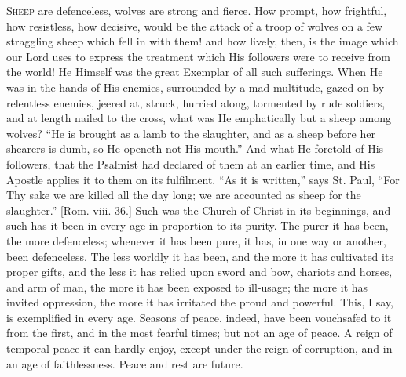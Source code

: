 S\textsc{heep} are defenceless, wolves are strong and fierce. How prompt,
how frightful, how resistless, how decisive, would be the attack of a
troop of wolves on a few straggling sheep which fell in with them! and
how lively, then, is the image which our Lord uses to express the
treatment which His followers were to receive from the world! He
Himself was the great Exemplar of all such sufferings. When He was in
the hands of His enemies, surrounded by a mad multitude, gazed on by
relentless enemies, jeered at, struck, hurried along, tormented by
rude soldiers, and at length nailed to the cross, what was He
emphatically but a sheep among wolves? ``He is brought as a lamb
to the slaughter, and as a sheep before her shearers is dumb, so He
openeth not His mouth.'' And what He foretold of His followers,
that the Psalmist had declared of them at an earlier time, and His
Apostle applies it to them on its fulfilment. ``As it is
written,'' says St. Paul, ``For Thy sake we are killed all the
day long; we are accounted as sheep for the slaughter.'' [Rom.
viii. 36.] Such was the Church of Christ in its beginnings, and such
has it been in every age in proportion to its purity. The purer it has
been, the more defenceless; whenever it has been pure, it has, in one
way or another, been defenceless. The less worldly it has been, and
the more it has cultivated its proper gifts, and the less it has
relied upon sword and bow, chariots and horses, and arm of man, the
more it has been exposed to ill-usage; the more it has invited
oppression, the more it has irritated the proud and powerful. This, I
say, is exemplified in every age. Seasons of peace, indeed, have been
vouchsafed to it from the first, and in the most fearful times; but
not an age of peace. A reign of temporal peace it can hardly enjoy,
except under the reign of corruption, and in an age of faithlessness.
Peace and rest are future.

